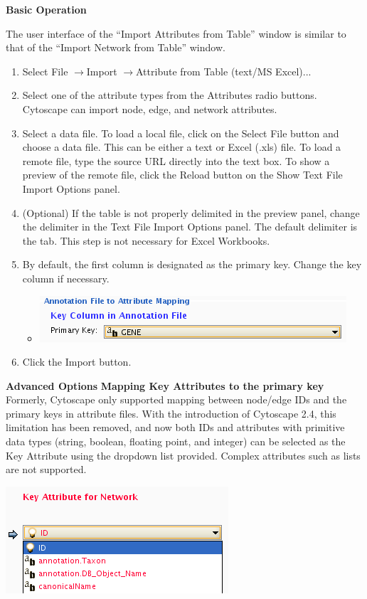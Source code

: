  \textbf{Basic Operation}

 The user interface of the ``Import Attributes from Table'' window is similar to that of the ``Import Network from Table'' window. 
\begin{enumerate}
\item Select File $\rightarrow$Import $\rightarrow$Attribute from Table (text/MS
Excel)... 
\item Select one of the attribute types from the Attributes radio buttons.
Cytoscape can import node, edge, and network attributes. 
\item Select a data file. To load a local file, click on the Select File button
and choose a data file. This can be either a text or Excel (.xls) file. To load
a remote file, type the source URL directly into the text box. To show a
preview of the remote file, click the Reload button on the Show Text File
Import Options panel. 
\item (Optional) If the table is not properly delimited in the preview panel,
change the delimiter in the Text File Import Options panel. The default
delimiter is the tab. This step is not necessary for Excel Workbooks. 
\item By default, the first column is designated as the primary key. Change the
key column if necessary.
\begin{itemize}
\item \includegraphics[width=\textwidth]{images/attribute_table_import_primary_key.png} 
\end{itemize}
\item Click the Import button. 
\end{enumerate}
 
\textbf{Advanced Options}
\textbf{Mapping Key Attributes to the primary key}
 Formerly, Cytoscape only supported mapping between node/edge IDs and the
primary keys in attribute files. With the introduction of Cytoscape 2.4, this
limitation has been removed, and now both IDs and attributes with primitive
data types (string, boolean, floating point, and integer) can be selected as
the Key Attribute using the dropdown list provided. Complex attributes such as
lists are not supported. 


 \includegraphics[width=\textwidth]{images/attribute_table_import_keyattr.png} 


